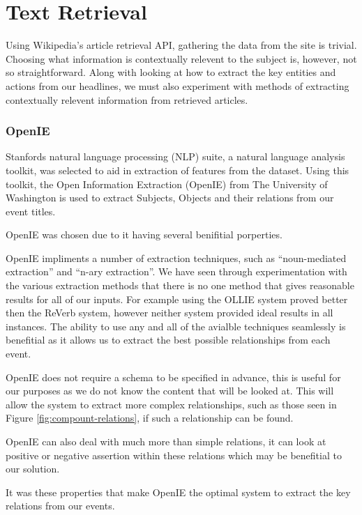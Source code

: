 \documentclass[bsc,frontabs,twoside,singlespacing,parskip,deptreport]{infthesis}     %
\begin{document}
\section{Text Retrieval}
Using Wikipedia's article retrieval API, gathering the data from
the site is trivial.
Choosing what information is contextually relevent to the subject is, however, not so straightforward.
Along with looking at how to extract the key entities and actions from our 
headlines, we must also experiment with methods of extracting contextually relevent information from
retrieved articles.

\subsubsection{OpenIE}
Stanfords natural language processing (NLP) suite,
a natural language analysis toolkit,
was selected to aid in extraction of features from the dataset.
Using this toolkit, the Open Information Extraction (OpenIE) from
The University of Washington is used to extract Subjects, Objects
and their relations from our event titles.

OpenIE was chosen due to it having several benifitial porperties.

OpenIE impliments a number of extraction techniques, such as ``noun-mediated extraction'' and ``n-ary extraction''.
We have seen through experimentation with the various
extraction methods that there is no one method that gives reasonable results for all of our inputs.
For example using the OLLIE system proved better then the ReVerb system, however neither system provided ideal results in all instances.%
The ability to use any and all of the avialble techniques seamlessly is benefitial as it allows us to
extract the best possible relationships from each event. 

OpenIE does not require a schema to be specified in advance, this is useful for our purposes
as we do not know the content that will be looked at. This will allow the system to extract
more complex relationships, such as those seen in Figure \ref{fig:compount-relations}, if such
a relationship can be found.

OpenIE can also deal with much more than simple relations,
it can look at positive or negative assertion within these relations which may be benefitial to our
solution.

It was these properties that make OpenIE the optimal system to extract the key relations from our events.
\end{document}
